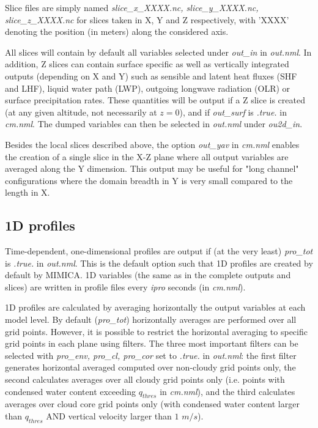 \documentclass[12pt,A4,french]{article}
\begin{document}
Slice files are simply named {\it slice\_x\_XXXX.nc, slice\_y\_XXXX.nc, slice\_z\_XXXX.nc} for slices taken in X, Y and Z respectively, with 'XXXX' denoting the position (in meters) along the considered axis. 

All slices will contain by default all variables selected under {\it out\_in} in {\it out.nml}. In addition, Z slices can contain surface specific as well as vertically integrated outputs (depending on X and Y) such as sensible and latent heat fluxes (SHF and LHF), liquid water path (LWP), outgoing longwave radiation (OLR) or surface precipitation rates. These quantities will be output if a Z slice is created (at any given altitude, not necessarily at $z = 0$), and if {\it out\_surf} is {\it .true.} in {\it cm.nml}. The dumped variables can then be selected in {\it out.nml} under {\it ou2d\_in}. 

Besides the local slices described above, the option {\it out\_yav} in {\it cm.nml} enables the creation of a single slice in the X-Z plane where all output variables are averaged along the Y dimension. This output may be useful for "long channel" configurations where the domain breadth in Y is very small compared to the length in X.

\subsection{1D profiles}

Time-dependent, one-dimensional profiles are output if (at the very least) {\it pro\_tot} is {\it .true.} in {\it out.nml}. This is the  default option such that 1D profiles are created by default by MIMICA. 1D variables (the same as in the complete outputs and slices) are written in profile files every {\it ipro} seconds (in {\it cm.nml}). 

1D profiles are calculated by averaging horizontally the output variables at each model level. By default ({\it pro\_tot}) horizontally averages are performed over all grid points. However, it is possible to restrict the horizontal averaging to specific grid points in each plane using filters. The three most important filters can be selected with {\it pro\_env, pro\_cl, pro\_cor} set to {\it .true.} in {\it out.nml}: the first filter generates horizontal averaged computed over non-cloudy grid points only, the second calculates averages over all cloudy grid points only (i.e. points with condensed water content exceeding $q_{thres}$ in {\it cm.nml}), and the third calculates averages over cloud core grid points only (with condensed water content larger than $q_{thres}$ AND vertical velocity larger than $1$ $m/s$).
\end{document}
